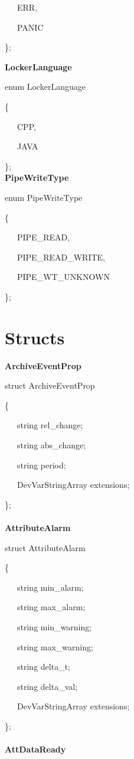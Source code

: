 ~~~ERR,

~~~PANIC

\};\\

\begin{flushleft}
\textbf{LockerLanguage}
\par\end{flushleft}

enum LockerLanguage

\{

~~~CPP,

~~~JAVA

\};\\

\textbf{PipeWriteType}

enum PipeWriteType

\{

~~~PIPE\_READ,

~~~PIPE\_READ\_WRITE,

~~~PIPE\_WT\_UNKNOWN

\};

\section{Structs}

\textbf{ArchiveEventProp}

struct ArchiveEventProp

\{

~~~string rel\_change;

~~~string abs\_change;

~~~string period;

~~~DevVarStringArray extensions;

\};\textbf{}\\
\textbf{}\\
\textbf{AttributeAlarm}

struct AttributeAlarm

\{

~~~string min\_alarm;

~~~string max\_alarm;

~~~string min\_warning;

~~~string max\_warning;

~~~string delta\_t;

~~~string delta\_val;

~~~DevVarStringArray extensions;

\};\textbf{}\\
\textbf{}\\
\textbf{AttDataReady}


